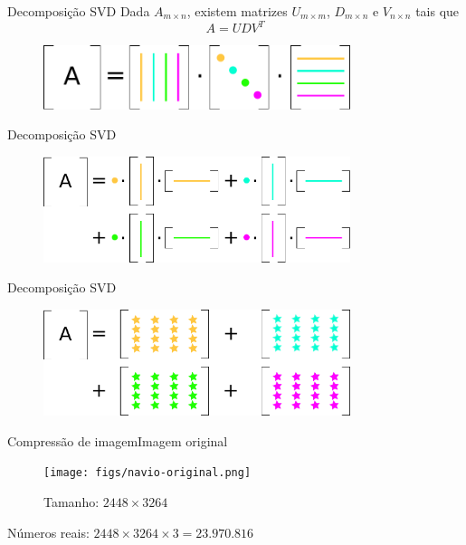 \documentclass{beamer}
\begin{document}
\begin{frame}{Decomposi\c{c}\~ao SVD}
    Dada $A_{m \times n}$, existem matrizes $U_{m \times m}$, $D_{m \times n}$
    e $V_{n \times n}$ tais que
    \[A = UDV^T\]


    \begin{figure}
        \centering
        \includegraphics[width=0.8\textwidth]{figs/svd2.pdf}
    \end{figure}
\end{frame}

\begin{frame}{Decomposi\c{c}\~ao SVD}
    \begin{figure}
        \centering
        \includegraphics[width=0.8\textwidth]{figs/svd3.pdf}
    \end{figure}
\end{frame}

\begin{frame}{Decomposi\c{c}\~ao SVD}
    \begin{figure}
        \centering
        \includegraphics[width=0.8\textwidth]{figs/svd4.pdf}
    \end{figure}
\end{frame}

\begin{frame}{Compress\~ao de imagem}{Imagem original}
    \begin{figure}
        \centering
        \texttt{[image: figs/navio-original.png]}
        \caption{Tamanho: $2448 \times 3264$}
    \end{figure}
    \pause
    \begin{center}
        N\'umeros reais: $2448\times3264\times3=23.970.816$
    \end{center}
\end{frame}
\end{document}

